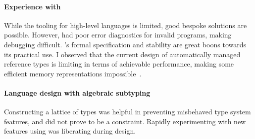 \paragraph{Experience with \wasm{}}
While the \wasm{} tooling for high-level languages is limited, good bespoke solutions are possible. However, \binaryen{} had poor error diagnostics for invalid programs, making debugging difficult. \wasm{}'s formal specification and stability are great boons towards its practical use.
I observed that the current design of automatically managed reference types is limiting in terms of achievable performance, \eg{} making some efficient memory representations impossible~\cite{double-ended-bit-stealing}.

\paragraph{Language design with algebraic subtyping} Constructing a lattice of types was helpful in preventing misbehaved type system features, and did not prove to be a constraint. Rapidly experimenting with new features using \inference{} was liberating during design.
